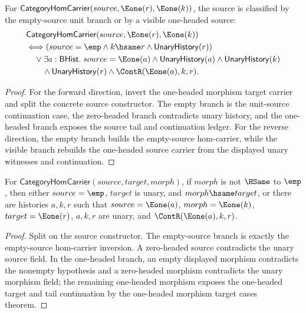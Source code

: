 \begin{theorem}
\label{thm:category-e1-target-e1-morphism-source-cases}
For $\mathsf{CategoryHomCarrier}(source,\Eone(r),\Eone(k))$, the source is
classified by the empty-source unit branch or by a visible one-headed source:
$$
\begin{aligned}
&\mathsf{CategoryHomCarrier}(source,\Eone(r),\Eone(k))\\
&\Longleftrightarrow
\left(source=\emp\land k\hsame r\land \mathsf{UnaryHistory}(r)\right)\\
&\quad{}\lor
\exists a:\mathsf{BHist}.\;
source=\Eone(a)\land \mathsf{UnaryHistory}(a)\land \mathsf{UnaryHistory}(k)\\
&\qquad{}\land \mathsf{UnaryHistory}(r)\land \ContR(\Eone(a),k,r).
\end{aligned}
$$
\end{theorem}
\begin{proof}
For the forward direction, invert the one-headed morphism target carrier and
split the concrete source constructor. The empty branch is the unit-source
continuation case, the zero-headed branch contradicts unary history, and the
one-headed branch exposes the source tail and continuation ledger. For the
reverse direction, the empty branch builds the empty-source hom-carrier, while
the visible branch rebuilds the one-headed source carrier from the displayed
unary witnesses and continuation.
\end{proof}

\begin{theorem}
\label{thm:category-hom-carrier-nonempty-morphism-source-cases}
For $\mathsf{CategoryHomCarrier}(source,target,morph)$, if $morph$ is not
$\HSame$ to $\emp$, then either $source=\emp$, $target$ is unary, and
$morph\hsame target$, or there are histories $a,k,r$ such that
$source=\Eone(a)$, $morph=\Eone(k)$, $target=\Eone(r)$, $a,k,r$ are unary, and
$\ContR(\Eone(a),k,r)$.
\end{theorem}
\begin{proof}
Split on the source constructor. The empty-source branch is exactly the
empty-source hom-carrier inversion. A zero-headed source contradicts the unary
source field. In the one-headed branch, an empty displayed morphism contradicts
the nonempty hypothesis and a zero-headed morphism contradicts the unary
morphism field; the remaining one-headed morphism exposes the one-headed target
and tail continuation by the one-headed morphism target cases theorem.
\end{proof}

